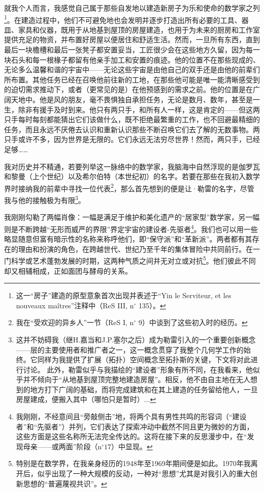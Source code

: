 就我个人而言，我感觉自己属于那些自发地以建造新房子为乐和使命的数学家之列\footnote{这一“房子”建造的原型意象首次出现并表述于“Yin le Serviteur, et les nouveaux maîtres”注释中（ReS III, n$^{\circ}$ 135）。}。在建造过程中，他们不可避免地也会发明并逐步打造出所有必要的工具、器皿、家具和仪器，既用于从地基到屋顶的房屋建造，也用于为未来的厨房和工作室提供充足的物资，并布置好房屋以便居住和舒适生活。然而，一旦所有东西，直到最后一块檐槽和最后一张凳子都安置妥当，工匠很少会在这些地方久留，因为每一块石头和每一根椽子都留有他亲手加工和安置的痕迹。他的位置不在那些现成的、无论多么温馨和谐的宇宙中——无论这些宇宙是由他自己的双手还是由他的前辈们所布置。其他任务已经在召唤他前往新的工地，在那些他可能是唯一能清晰感受到的迫切需求推动下，或者（更常见的是）在他预感到的需求之前。他的位置是在广阔天地中。他是风的朋友，毫不畏惧独自承担任务，无论是数月、数年，甚至是一生，除非有援手及时到来。他只有两只手，和所有人一样，这是肯定的——但这两只手每时每刻都能猜出它们该做什么，既不拒绝最繁重的工作，也不回避最精细的任务，而且永远不厌倦去认识和重新认识那些不断召唤它们去了解的无数事物。两只手或许不多，因为世界是无限的。它们永远无法穷尽世界！然而，两只手，已经足够……

我对历史并不精通，若要列举这一脉络中的数学家，我脑海中自然浮现的是伽罗瓦和黎曼（上个世纪）以及希尔伯特（本世纪初）的名字。若要在那些在我初入数学界时接纳我的前辈中寻找一位代表\footnote{我在“受欢迎的异乡人”一节（ReS I, n$^{\circ}$ 9）中谈到了这些初入时的经历。}，那么首先想到的便是让·勒雷的名字，尽管我与他的接触极为有限\footnote{这并不妨碍我（继H.嘉当和J.P.塞尔之后）成为勒雷引入的一个重要创新概念——层的主要使用者和推广者之一，这一概念贯穿了我整个几何学工作的始终。它同样为我提供了扩展（拓扑）空间概念至拓扑斯的关键，下文将对此进行讨论。
此外，勒雷似乎与我描绘的“建设者”形象有所不同，在我看来，他似乎并不倾向于“从地基到屋顶完整地建造房屋”。相反，他不由自主地在无人想到的地方打下广阔的基础，而将完成建筑和在其上建造的任务留给他人，一旦房屋建成，便搬入其中（哪怕只是暂时）...}。

我刚刚勾勒了两幅肖像：一幅是满足于维护和美化遗产的“居家型”数学家，另一幅则是不断跨越“无形而威严的界限”界定宇宙的建设者-先驱者\footnote{我刚刚，不经意间且“旁敲侧击”地，将两个具有男性共鸣的形容词（“建设者”和“先驱者”）并列，它们表达了探索冲动中截然不同且更为微妙的方面，这些方面是这些名称所无法完全传达的。这将在接下来的反思漫步中，在“发现母亲——或两面”阶段（$\mathrm{n}^{\circ} 17$）中显现。}。我们也可以用一些略显随意但富有暗示性的名称来称呼他们，即“保守派”和“革新派”。两者都有其存在的理由和扮演的角色，在跨越世代、世纪乃至千年的集体冒险中共同前行。在一门科学或艺术蓬勃发展的时期，这两种气质之间并无对立或对抗\footnote{特别是在数学界，在我亲身经历的1948年至1969年期间便是如此。1970年我离开后，似乎出现了一种大规模的反动，一种对“思想”尤其是对我引入的重大创新思想的“普遍蔑视共识”。}。他们彼此不同却又相辅相成，正如面团与酵母的关系。

